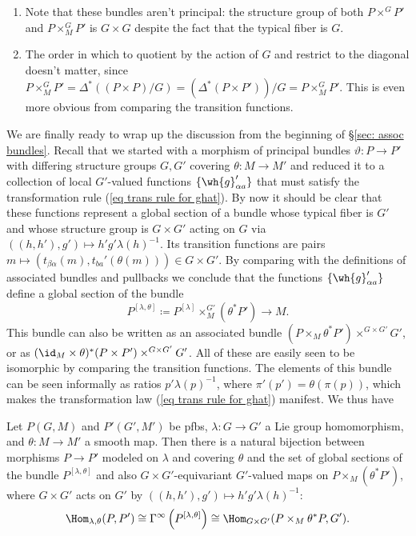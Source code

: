\begin{rem}
\begin{enumerate}
    \item Note that these bundles aren't principal: the structure group of both $P\times^G P'$ and $P\times^G_MP'$ is $G\times G$ despite the fact that the typical fiber is $G$.
    \item The order in which to quotient by the action of $G$ and restrict to the diagonal doesn't matter, since $P\times^G_MP'=\Delta^\ast((P\times P)\slash G)=(\Delta^\ast(P\times P'))\slash G=P\times^G_M P'$. This is even more obvious from comparing the transition functions.
\end{enumerate}
\end{rem}


We are finally ready to wrap up the discussion from the beginning of \S\ref{sec: assoc bundles}. Recall that we started with a morphism of principal bundles $\vartheta:P\to P'$ with differing structure groups $G,G'$ covering $\theta:M\to M'$ and reduced it to a collection of local $G'$-valued functions $\{\wh{g}_{\alpha a}'\}$ that must satisfy the transformation rule (\ref{eq trans rule for ghat}). By now it should be clear that these functions represent a global section of a bundle whose typical fiber is $G'$ and whose structure group is $G\times G'$ acting on $G$ via $((h,h'),g')\mapsto h'g'\lambda(h)^{-1}$. Its transition functions are pairs $m\mapsto (t_{\beta\alpha}(m),t_{ba}'(\theta(m)))\in G\times G'$. By comparing with the definitions of associated bundles and pullbacks we conclude that the functions $\{\wh{g}_{\alpha a}'\}$ define a global section of the bundle
\[\boxed{P^{[\lambda,\theta]}\coloneqq P^{[\lambda]}\times^{G'}_M(\theta^\ast P')\to M.}\]
This bundle can also be written as an associated bundle $(P\times_M \theta^\ast P')\times^{G\times G'} G'$, or as $(\id_M\times \theta)^\ast(P\times P')\times^{G\times G'}G'$. All of these are easily seen to be isomorphic by comparing the transition functions. The elements of this bundle can be seen informally as ratios $p'\lambda(p)^{-1}$, where $\pi'(p')=\theta(\pi(p))$, which makes the transformation law (\ref{eq trans rule for ghat}) manifest. We thus have
\begin{prop}\label{prop pfb morphisms}
    Let $P(G,M)$ and $P'(G',M')$ be \glspl{pfb}, $\lambda:G\to G'$ a Lie group homomorphism, and $\theta:M\to M'$ a smooth map. Then there is a natural bijection between morphisms $P\to P'$ modeled on $\lambda$ and covering $\theta$ and the set of global sections of the bundle $P^{[\lambda,\theta]}$ and also $G\times G'$-equivariant $G'$-valued maps on $P\times_M (\theta^\ast P')$, where $G\times G'$ acts on $G'$ by $((h,h'),g')\mapsto h'g'\lambda(h)^{-1}$:
    \[\Hom_{\lambda,\theta}(P,P')\cong \Gamma^\infty\left(P^{[\lambda,\theta]}\right)\cong \Hom_{G\times G'}(P\times_M \theta^\ast P,G').\]
\end{prop}


